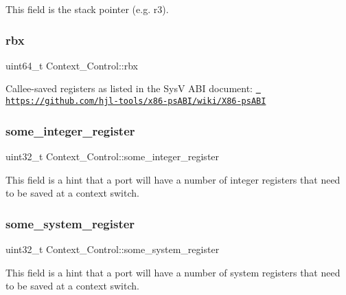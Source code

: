 This field is the stack pointer (e.\+g. r3). \mbox{\label{structContext__Control_a5a461836201d44bd52d0dbcb462f78d9}} 
\subsubsection{\texorpdfstring{rbx}{rbx}}
{\footnotesize\ttfamily uint64\+\_\+t Context\+\_\+\+Control\+::rbx}

Callee-\/saved registers as listed in the SysV A\+BI document\+: \href{https://github.com/hjl-tools/x86-psABI/wiki/X86-psABI}{\texttt{ https\+://github.\+com/hjl-\/tools/x86-\/ps\+A\+B\+I/wiki/\+X86-\/ps\+A\+BI}} \mbox{\label{structContext__Control_a420704aabf47922927b9c3d150e6b15e}} 
\subsubsection{\texorpdfstring{some\_integer\_register}{some\_integer\_register}}
{\footnotesize\ttfamily uint32\+\_\+t Context\+\_\+\+Control\+::some\+\_\+integer\+\_\+register}

This field is a hint that a port will have a number of integer registers that need to be saved at a context switch. \mbox{\label{structContext__Control_a73280d52519942a6ade3a2e825289c15}} 
\subsubsection{\texorpdfstring{some\_system\_register}{some\_system\_register}}
{\footnotesize\ttfamily uint32\+\_\+t Context\+\_\+\+Control\+::some\+\_\+system\+\_\+register}

This field is a hint that a port will have a number of system registers that need to be saved at a context switch. \mbox{\label{structContext__Control_a8338469d2d729ff14203f93b65d7c351}} 
